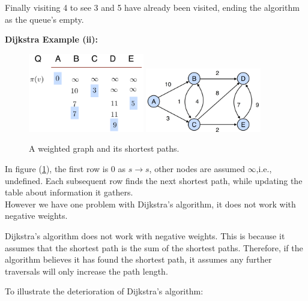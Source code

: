 \noindent
Finally visiting 4 to see 3 and 5 have already been visited, ending the algorithm as the queue's empty.


\newpage

\noindent
\textbf{Dijkstra Example (ii):}\\

\begin{figure}[h!]
    \centering
    \includegraphics[width=0.45\textwidth]{./Sections/dstra/w_dist.png} %
    \hfill %
    \includegraphics[width=0.45\textwidth]{./Sections/dstra/w_graph.png} %
    \caption{A weighted graph and its shortest paths.}
    \label{fig:combined_figure}
\end{figure}


\noindent
In figure (\ref{fig:combined_figure}), the first row is $0$ as $s\to s$, other nodes are assumed $\infty$,i.e., undefined. Each subsequent row finds the next shortest path, while 
updating the table about information it gathers.\\
\noindent
However we have one problem with Dijkstra's algorithm, it does not work with negative weights.
\begin{theo}
    
    Dijkstra's algorithm does not work with negative weights. This is because it assumes that the shortest path is the sum of the shortest paths. Therefore,
    if the algorithm believes it has found the shortest path, it assumes any further traversals will only increase the path length.
\end{theo}


\noindent
To illustrate the deterioration of Dijkstra's algorithm:

